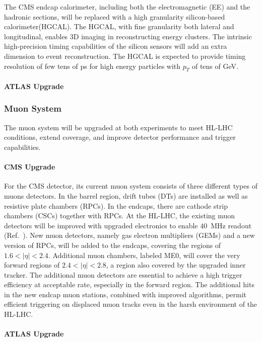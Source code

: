 The CMS endcap calorimeter, including both the electromagnetic (EE) and the hadronic sections, will be replaced with a high granularity silicon-based calorimeter(HGCAL). 
The HGCAL, with fine granularity both lateral and longitudinal, enables 3D imaging in reconstructing energy clusters.
The intrinsic high-precision timing capabilities of the silicon sensors will add an extra dimension to event reconstruction. The HGCAL is expected to provide timing resolution of few tens of ps for high energy particles with $p_T$ of tens of GeV. 

\paragraph{ATLAS Upgrade}


\subsubsection{Muon System} \label{sec:upgrademuon}

The muon system will be upgraded at both experiments to meet HL-LHC conditions, extend coverage, and improve detector performance and trigger capabilities. 

\paragraph{CMS Upgrade} 
For the CMS detector, its current muon system consists of three different types of muons detectors. In the barrel region, drift tubes (DTs) are installed as well as resistive plate chambers (RPCs). In the endcaps, there are cathode strip chambers (CSCs) together with RPCs. 
At the HL-LHC, the existing muon detectors will be improved with upgraded electronics to enable $40$~MHz readout (Ref.~\cite{Lourenco:2283189}). 
New muon detectors, namely gas electron multipliers (GEMs) and a new version of RPCs, will be added to the endcaps, covering the regions of $1.6<|\eta|<2.4$. 
Additional muon chambers, labeled ME0, will cover the very forward regions of $2.4<|\eta|<2.8$, a region also covered by the upgraded inner tracker. 
The additional muon detectors are essential to achieve a high trigger efficiency at acceptable rate, especially in the forward region.
The additional hits in the new endcap muon stations, combined with improved algorithms, permit efficient triggering on displaced muon tracks even in the harsh environment of the HL-LHC. 

\paragraph{ATLAS Upgrade}

